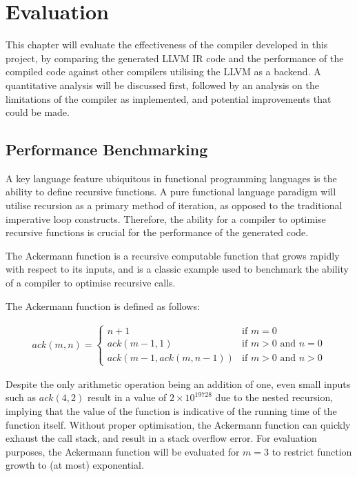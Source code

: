 \chapter{Evaluation}

This chapter will evaluate the effectiveness of the compiler developed in this project, by comparing
the generated LLVM IR code and the performance of the compiled code against other compilers
utilising the LLVM as a backend. A quantitative analysis will be discussed first, followed by an
analysis on the limitations of the compiler as implemented, and potential improvements that could be
made.

\section{Performance Benchmarking}

A key language feature ubiquitous in functional programming languages is the ability to define
recursive functions. A pure functional language paradigm will utilise recursion as a primary method
of iteration, as opposed to the traditional imperative loop constructs. Therefore, the ability for a
compiler to optimise recursive functions is crucial for the performance of the generated code.

The Ackermann function is a recursive computable function that grows rapidly with respect to its
inputs, and is a classic example used to benchmark the ability of a compiler to optimise recursive
calls.

The Ackermann function is defined as follows:

\singlespacing
\vspace{-0.7cm}
\begin{align*}
    ack(m, n) = \begin{cases}
        n + 1 & \text{if } m = 0 \\
        ack(m - 1, 1) & \text{if } m > 0 \text{ and } n = 0 \\
        ack(m - 1, ack(m, n - 1)) & \text{if } m > 0 \text{ and } n > 0
    \end{cases}
\end{align*}
\doublespacing

Despite the only arithmetic operation being an addition of one, even small inputs such as $ack(4,2)$
result in a value of $2 \times 10^{19728}$ due to the nested recursion, implying that the value of
the function is indicative of the running time of the function itself. Without proper optimisation,
the Ackermann function can quickly exhaust the call stack, and result in a stack overflow error. For
evaluation purposes, the Ackermann function will be evaluated for $m=3$ to restrict function growth
to (at most) exponential.

